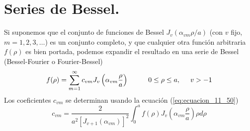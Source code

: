 \section{Series de Bessel.}
Si suponemos que el conjunto de funciones de Bessel $J_{v} (\alpha_{vm} \rho /a)$ (con $v$ fijo, $m =1,2,3,\ldots$) es un conjunto completo, y que cualquier otra función arbitraria $f(\rho)$ es bien portada, podemos expandir el resultado en una serie de Bessel (Bessel-Fourier o Fourier-Bessel)
\begin{equation}
f(\rho) = \sum_{m=1}^{\infty} c_{vm} J_{v} \left( \alpha_{vm} \dfrac{\rho}{a} \right) \hspace{1cm} 0 \leq \rho \leq a, \hspace{0.5cm} v > -1
\label{eq:ecuacion_11_51}
\end{equation}
Los coeficientes $c_{vm}$ se determinan usando la ecuación (\ref{eq:ecuacion_11_50})
\begin{equation}
c_{vm} = \dfrac{2}{a^{2}[J_{v+1} (\alpha_{vm})]^{2}} \int_{0}^{a} f(\rho) J_{v} \left( \alpha_{vm} \dfrac{\rho}{a} \right) \rho d \rho 
\label{eq:ecuacion_11_52}
\end{equation}
